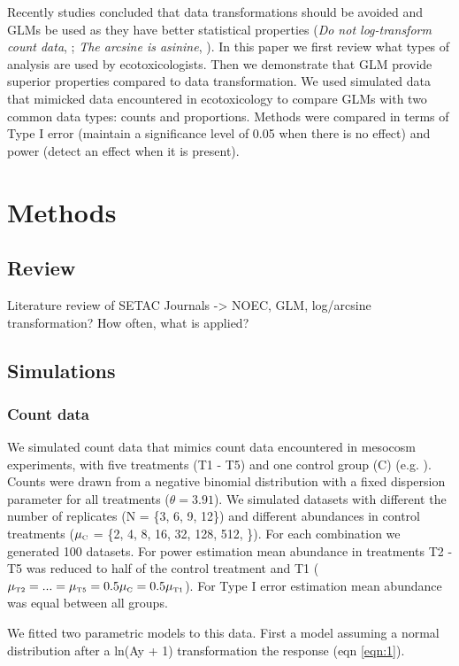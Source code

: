 \documentclass{scrartcl}\usepackage[]{graphicx}\usepackage[]{color}
\begin{document}
Recently studies concluded that data transformations should be avoided and GLMs be used as they have better statistical properties (\emph{Do not log-transform count data}, \citep{ohara_not_2010}; \emph{The arcsine is asinine}, \citep{warton_arcsine_2011}).
In this paper we first review what types of analysis are used by ecotoxicologists.
Then we demonstrate that GLM provide superior properties compared to data transformation. 
We used simulated data that mimicked data encountered in ecotoxicology to compare GLMs with two common data types: counts and proportions. 
Methods were compared in terms of Type I error (maintain a significance level of 0.05 when there is no effect) and power (detect an effect when it is present). 



\section{Methods}
\subsection{Review}
Literature review of SETAC Journals -> NOEC, GLM, log/arcsine transformation? How often, what is applied?

\subsection{Simulations}
\subsubsection{Count data}
We simulated count data that mimics count data encountered in mesocosm experiments, with five treatments (T1 - T5) and one control group (C) (e.g. \citep{brock_minimum_2014}).
Counts were drawn from a negative binomial distribution with a fixed dispersion parameter for all treatments ($\theta = 3.91$).
We simulated datasets with different the number of replicates (N = \{3, 6, 9, 12\}) and different abundances in control treatments ($\mu_\text{\tiny C}$ = \{2, 4, 8, 16, 32, 128, 512, \}). 
For each combination we generated 100 datasets.
For power estimation mean abundance in treatments T2 - T5 was reduced to half of the control treatment and T1 ($\mu_\text{\tiny T2} = ... = \mu_\text{\tiny T5} = 0.5 \mu_\text{\tiny C} = 0.5 \mu_\text{\tiny T1} $).
For Type I error estimation mean abundance was equal between all groups.

We fitted two parametric models to this data.
First a model assuming a normal distribution after a ln(Ay + 1) transformation the response (eqn \ref{eqn:1}).
\end{document}
